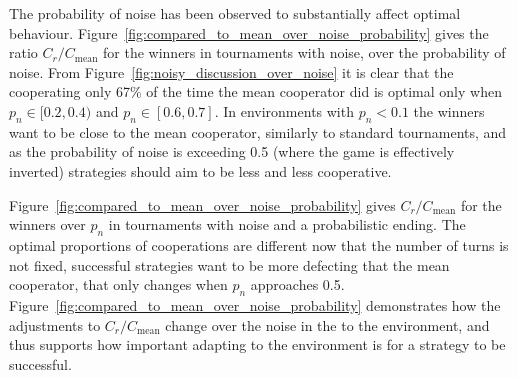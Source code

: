 \documentclass{article}
\begin{document}
The probability of noise has been observed to substantially affect optimal
behaviour.
Figure~\ref{fig:compared_to_mean_over_noise_probability} gives the ratio \(C_r /
C_{\text{mean}}\) for the winners in tournaments with noise, over the
probability of noise. From Figure~\ref{fig:noisy_discussion_over_noise} it is
clear that the cooperating only 67\% of the time the mean cooperator did is
optimal only when \(p_n \in [0.2, 0.4)\) and \(p_n \in [0.6, 0.7]\). In
environments with \(p_n < 0.1\) the winners want to be close to the mean
cooperator, similarly to standard tournaments, and as the probability of noise
is exceeding 0.5 (where the game is effectively inverted) strategies should
aim to be less and less cooperative.

Figure~\ref{fig:compared_to_mean_over_noise_probability} gives \(C_r /
C_{\text{mean}}\) for the winners over \(p_n\) in tournaments with noise and a
probabilistic ending. The optimal proportions of cooperations are different
now that the number of turns is not fixed, successful strategies
want to be more defecting that the mean cooperator, that only changes when
\(p_n\) approaches 0.5. Figure~\ref{fig:compared_to_mean_over_noise_probability}
demonstrates how the adjustments to \(C_r /C_{\text{mean}}\) change over the
noise in the to the environment, and thus supports how important adapting to
the environment is for a strategy to be successful.
\end{document}

